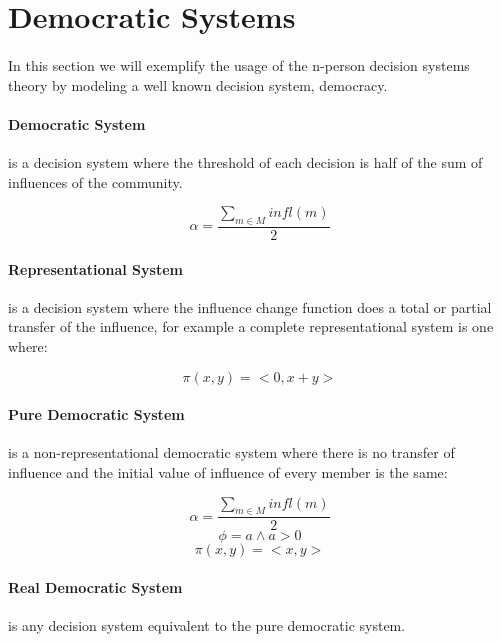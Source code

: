 %
%
\section{Democratic Systems}\label{democratic systems}

\paragraph{} In this section we will exemplify the usage of the n-person decision systems theory by modeling a well known decision system, democracy.

\paragraph{Democratic System} is a decision system where the threshold of each decision is half of the sum of influences of the community.

$$\alpha = \frac{\sum\limits_{m \in M} infl(m)}{2}$$

\paragraph{Representational System} is a decision system where the influence change function does a total or partial transfer of the influence, for example a complete representational system is one where:

$$\pi(x, y) = <0, x+y>$$

\paragraph{Pure Democratic System} is a non-representational democratic system where there is no transfer of influence and the initial value of influence of every member is the same:

$$\alpha = \frac{\sum\limits_{m \in M} infl(m)}{2}$$
$$\phi = a \wedge a > 0$$
$$\pi(x, y) = <x, y>$$

\paragraph{Real Democratic System} is any decision system equivalent to the pure democratic system.
